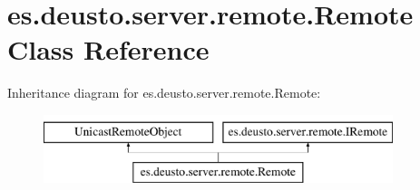 \hypertarget{classes_1_1deusto_1_1server_1_1remote_1_1_remote}{}\section{es.\+deusto.\+server.\+remote.\+Remote Class Reference}
\label{classes_1_1deusto_1_1server_1_1remote_1_1_remote}
Inheritance diagram for es.\+deusto.\+server.\+remote.\+Remote\+:\begin{figure}[H]
\begin{center}
\leavevmode
\includegraphics[height=2.000000cm]{classes_1_1deusto_1_1server_1_1remote_1_1_remote}
\end{center}
\end{figure}
